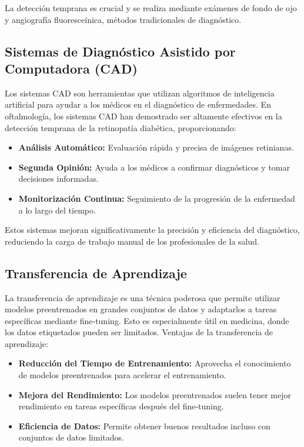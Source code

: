 La detección temprana es crucial y se realiza mediante exámenes de fondo de ojo y angiografía fluoresceínica, métodos tradicionales de diagnóstico.

\subsection{Sistemas de Diagnóstico Asistido por Computadora (CAD)}

Los sistemas CAD son herramientas que utilizan algoritmos de inteligencia artificial para ayudar a los médicos en el diagnóstico de enfermedades. En oftalmología, los sistemas CAD han demostrado ser altamente efectivos en la detección temprana de la retinopatía diabética, proporcionando:

\begin{itemize}
 \item \textbf{Análisis Automático:} Evaluación rápida y precisa de imágenes retinianas.
 \item \textbf{Segunda Opinión:} Ayuda a los médicos a confirmar diagnósticos y tomar decisiones informadas.
 \item \textbf{Monitorización Continua:} Seguimiento de la progresión de la enfermedad a lo largo del tiempo.
\end{itemize}

Estos sistemas mejoran significativamente la precisión y eficiencia del diagnóstico, reduciendo la carga de trabajo manual de los profesionales de la salud.

\subsection{Transferencia de Aprendizaje}

La transferencia de aprendizaje es una técnica poderosa que permite utilizar modelos preentrenados en grandes conjuntos de datos y adaptarlos a tareas específicas mediante fine-tuning. Esto es especialmente útil en medicina, donde los datos etiquetados pueden ser limitados. Ventajas de la transferencia de aprendizaje:

\begin{itemize}
 \item \textbf{Reducción del Tiempo de Entrenamiento:} Aprovecha el conocimiento de modelos preentrenados para acelerar el entrenamiento.
 \item \textbf{Mejora del Rendimiento:} Los modelos preentrenados suelen tener mejor rendimiento en tareas específicas después del fine-tuning.
 \item \textbf{Eficiencia de Datos:} Permite obtener buenos resultados incluso con conjuntos de datos limitados.
\end{itemize}

